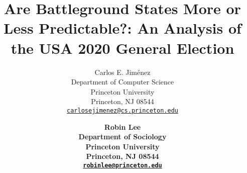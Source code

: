 \title{Are Battleground States More or Less Predictable?: An Analysis of the USA 2020 General Election}


\author{
	Carlos E. Jiménez\\
	Department of Computer Science\\
    Princeton University\\
    Princeton, NJ 08544\\
	\href{mailto:carlosej@princeton.edu}{\texttt{carlosejimenez@cs.princeton.edu}} \\
	\and
	\bf{Robin Lee} \\
	Department of Sociology\\
    Princeton University\\
    Princeton, NJ 08544\\
	\href{mailto:robinlee@princeton.edu}{\texttt{robinlee@princeton.edu}}
}


\renewcommand{\headeright}{}
\renewcommand{\undertitle}{}

